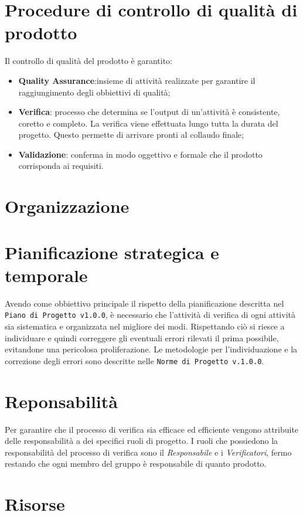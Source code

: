 \section{Procedure di controllo di qualità di prodotto}
Il controllo di qualità del prodotto è garantito: 
\begin{itemize}
	\item \textbf{Quality Assurance}:insieme di attività realizzate per garantire il raggiungimento degli obbiettivi di qualità;
	\item \textbf{Verifica}: processo che determina se l'output di un'attività è consistente, coretto e completo. La verifica viene effettuata lungo tutta la durata del progetto. Questo permette di arrivare pronti al collaudo finale;
	\item \textbf{Validazione}: conferma in modo oggettivo e formale che il prodotto corrisponda ai requisiti.
\end{itemize}
\section{Organizzazione}
\section{Pianificazione strategica e temporale}
Avendo come obbiettivo principale il rispetto della pianificazione descritta nel \texttt{Piano di Progetto v1.0.0}, è necessario che l'attività di verifica di ogni attività sia sistematica e organizzata nel migliore dei modi. 
Rispettando ciò si riesce a individuare e quindi correggere gli eventuali errori rilevati il prima possibile, evitandone una pericolosa proliferazione. 
Le metodologie per l'individuazione e la correzione degli errori sono descritte nelle \texttt{Norme di Progetto v.1.0.0}.
\section{Reponsabilità}
Per garantire che il processo di verifica sia efficace ed efficiente vengono attribuite delle responsabilità a dei specifici ruoli di progetto.
I ruoli che possiedono la responsabilità del processo di verifica sono il \textit{Responsabile} e i \textit{Verificatori}, fermo restando che ogni membro del gruppo è responsabile di quanto prodotto.
\section{Risorse}
